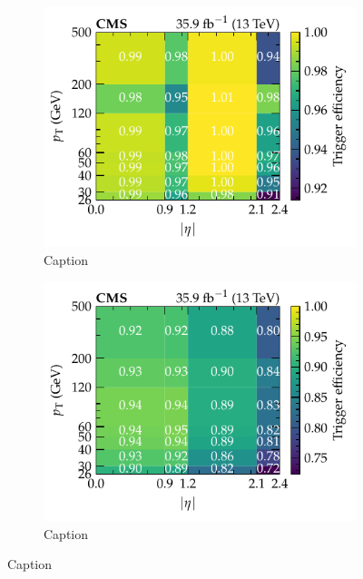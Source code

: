 \begin{figure}[htbp]
    \centering
    \begin{subfigure}[b]{0.49\textwidth}
        \centering
        \includegraphics{chapters/041_corrections/images/efficiencies/triggers/muons/muon_RunBCDEF_trigger_efficiency.pdf}
        \caption{Caption}
        \label{subfiga:muon-trigger-efficiency}
    \end{subfigure}
    \hfill
    \begin{subfigure}[b]{0.49\textwidth}
        \centering
        \includegraphics{chapters/041_corrections/images/efficiencies/triggers/muons/muon_RunGH_trigger_efficiency.pdf}
        \caption{Caption}
        \label{subfigb:muon-trigger-efficiency}
    \end{subfigure}
    \caption{Caption}
    \label{fig:muon-trigger-efficiency}
\end{figure}

